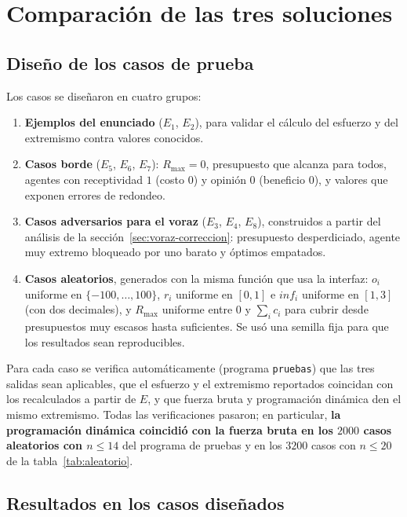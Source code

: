 \documentclass[11pt,letterpaper]{article}
\newcommand{\Rmax}{R_{\max}}
\begin{document}
\section{Comparación de las tres soluciones}

\subsection{Diseño de los casos de prueba}

Los casos se diseñaron en cuatro grupos:
\begin{enumerate}
  \item \textbf{Ejemplos del enunciado} ($E_1$, $E_2$), para validar el
        cálculo del esfuerzo y del extremismo contra valores conocidos.
  \item \textbf{Casos borde} ($E_5$, $E_6$, $E_7$): $\Rmax = 0$, presupuesto
        que alcanza para todos, agentes con receptividad $1$ (costo $0$) y
        opinión $0$ (beneficio $0$), y valores que exponen errores de
        redondeo.
  \item \textbf{Casos adversarios para el voraz} ($E_3$, $E_4$, $E_8$),
        construidos a partir del análisis de la sección~\ref{sec:voraz-correccion}:
        presupuesto desperdiciado, agente muy extremo bloqueado por uno
        barato y óptimos empatados.
  \item \textbf{Casos aleatorios}, generados con la misma función que usa la
        interfaz: $o_i$ uniforme en $\{-100,\dots,100\}$, $r_i$ uniforme en
        $[0,1]$ e $inf_i$ uniforme en $[1,3]$ (con dos decimales), y $\Rmax$
        uniforme entre $0$ y $\sum_i c_i$ para cubrir desde presupuestos muy
        escasos hasta suficientes. Se usó una semilla fija para que los
        resultados sean reproducibles.
\end{enumerate}

Para cada caso se verifica automáticamente (programa \texttt{pruebas}) que
las tres salidas sean aplicables, que el esfuerzo y el extremismo reportados
coincidan con los recalculados a partir de $E$, y que fuerza bruta y
programación dinámica den el mismo extremismo. Todas las verificaciones
pasaron; en particular, \textbf{la programación dinámica coincidió con la
fuerza bruta en los $2000$ casos aleatorios con $n \le 14$} del programa de
pruebas y en los $3200$ casos con $n \le 20$ de la tabla~\ref{tab:aleatorio}.

\subsection{Resultados en los casos diseñados}
\end{document}
